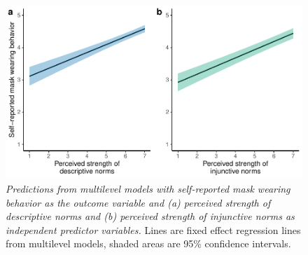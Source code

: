 \documentclass[
  english,
  man,floatsintext]{apa6}
\begin{document}
\begin{figure}
\centering
\includegraphics{manuscript_files/figure-latex/plotCorBehNorm-1.pdf}
\caption{\label{fig:plotCorBehNorm}\emph{Predictions from multilevel models with self-reported mask wearing behavior as the outcome variable and (a) perceived strength of descriptive norms and (b) perceived strength of injunctive norms as independent predictor variables.} Lines are fixed effect regression lines from multilevel models, shaded areas are 95\% confidence intervals.}
\end{figure}

\newpage
\end{document}

